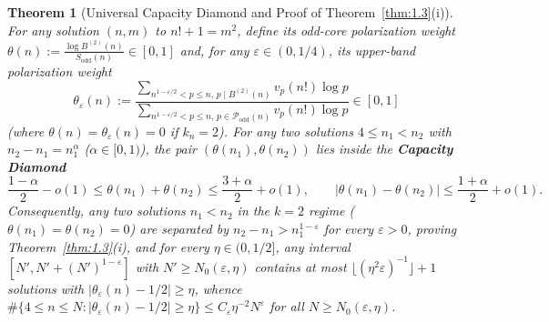 \documentclass[11pt,reqno]{amsart}
\newtheorem{theorem}{Theorem}[section]
\theoremstyle{remark}
\numberwithin{equation}{section}
\newcommand{\Podd}{\mathcal{P}_{\mathrm{odd}}}
\newcommand{\Sodd}{S_{\mathrm{odd}}}
\begin{document}
\begin{theorem}[{Universal Capacity Diamond and Proof of Theorem~\ref{thm:1.3}(i)}]\label{thm:6.4}
For any solution $(n, m)$ to $n! + 1 = m^2$, define its odd-core polarization weight $\theta(n) := \frac{\log B^{(2)}(n)}{\Sodd(n)} \in [0, 1]$ and, for any $\varepsilon \in (0, 1/4)$, its upper-band polarization weight
\[
\theta_\varepsilon(n) := \frac{\displaystyle\sum_{n^{1-\varepsilon/2} < p \le n,\, p \mid B^{(2)}(n)} v_p(n!)\log p}{\displaystyle\sum_{n^{1-\varepsilon/2} < p \le n,\, p \in \Podd(n)} v_p(n!)\log p} \in [0, 1]
\]
(where $\theta(n) = \theta_\varepsilon(n) = 0$ if $k_n = 2$). For any two solutions $4 \le n_1 < n_2$ with $n_2 - n_1 = n_1^\alpha$ ($\alpha \in [0, 1)$), the pair $(\theta(n_1), \theta(n_2))$ lies inside the \textbf{Capacity Diamond}
\begin{equation}\label{eq:6.8}
\frac{1 - \alpha}{2} - o(1) \le \theta(n_1) + \theta(n_2) \le \frac{3 + \alpha}{2} + o(1), \qquad \bigl|\theta(n_1) - \theta(n_2)\bigr| \le \frac{1 + \alpha}{2} + o(1).
\end{equation}
Consequently, any two solutions $n_1 < n_2$ in the $k = 2$ regime ($\theta(n_1) = \theta(n_2) = 0$) are separated by $n_2 - n_1 > n_1^{1-\varepsilon}$ for every $\varepsilon > 0$, proving Theorem~\ref{thm:1.3}(i), and for every $\eta \in (0, 1/2]$, any interval $[N', N' + (N')^{1-\varepsilon}]$ with $N' \ge N_0(\varepsilon, \eta)$ contains at most $\lfloor (\eta^2\varepsilon)^{-1} \rfloor + 1$ solutions with $|\theta_\varepsilon(n) - 1/2| \ge \eta$, whence $\#\{4 \le n \le N : |\theta_\varepsilon(n) - 1/2| \ge \eta\} \le C_\varepsilon \eta^{-2} N^\varepsilon$ for all $N \ge N_0(\varepsilon, \eta)$.
\end{theorem}
\end{document}
